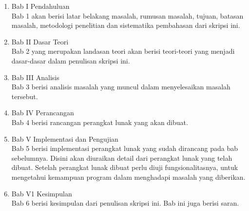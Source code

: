 \begin{enumerate}
	\item Bab I Pendahuluan
	\\
	Bab 1 akan berisi latar belakang masalah, rumusan masalah, tujuan, batasan masalah, metodologi penelitian dan sistematika pembahasan dari skripsi ini.

	\item Bab II Dasar Teori
	\\
	Bab 2 yang merupakan landasan teori akan berisi teori-teori yang menjadi dasar-dasar dalam penulisan skripsi ini.
	
	\item Bab III Analisis
	\\
	Bab 3 berisi analisis masalah yang muncul dalam menyelesaikan masalah tersebut.
	
	\item Bab IV Perancangan
	\\
	Bab 4 berisi rancangan perangkat lunak yang akan dibuat.
	
	\item Bab V Implementasi dan Pengujian
	\\
	Bab 5 berisi implementasi perangkat lunak yang sudah dirancang pada bab sebelumnya. Disini akan diuraikan detail dari perangkat lunak yang telah dibuat. Setelah perangkat lunak dibuat perlu diuji fungsionalitasnya, untuk mengetahui kemampuan program dalam menghadapi masalah yang diberikan. 
	
	\item Bab V1 Kesimpulan
	\\
	Bab 6 berisi kesimpulan dari penulisan skripsi ini. Bab ini juga berisi saran.
\end{enumerate}
